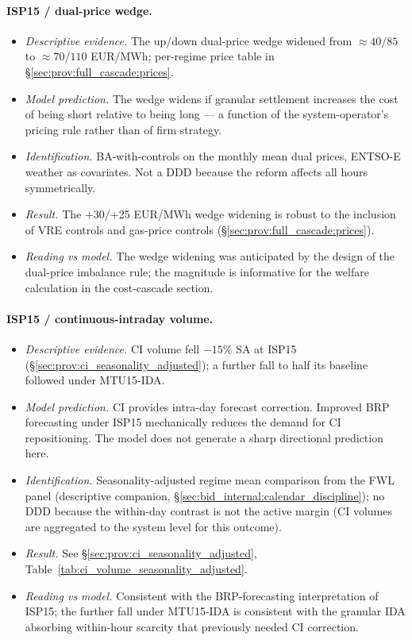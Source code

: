 \documentclass[11pt,a4paper]{article}
\begin{document}
\paragraph{ISP15 / dual-price wedge.}
\begin{itemize}
\item \emph{Descriptive evidence.} The up/down dual-price wedge widened from $\approx 40/85$ to $\approx 70/110$ EUR/MWh; per-regime price table in \S\ref{sec:prov:full_cascade:prices}.
\item \emph{Model prediction.} The wedge widens if granular settlement increases the cost of being short relative to being long --- a function of the system-operator's pricing rule rather than of firm strategy.
\item \emph{Identification.} BA-with-controls on the monthly mean dual prices, ENTSO-E weather as covariates. Not a DDD because the reform affects all hours symmetrically.
\item \emph{Result.} The +30/+25 EUR/MWh wedge widening is robust to the inclusion of VRE controls and gas-price controls (\S\ref{sec:prov:full_cascade:prices}).
\item \emph{Reading vs model.} The wedge widening was anticipated by the design of the dual-price imbalance rule; the magnitude is informative for the welfare calculation in the cost-cascade section.
\end{itemize}

\paragraph{ISP15 / continuous-intraday volume.}
\begin{itemize}
\item \emph{Descriptive evidence.} CI volume fell $-15\%$ SA at ISP15 (\S\ref{sec:prov:ci_seasonality_adjusted}); a further fall to half its baseline followed under MTU15-IDA.
\item \emph{Model prediction.} CI provides intra-day forecast correction. Improved BRP forecasting under ISP15 mechanically reduces the demand for CI repositioning. The model does not generate a sharp directional prediction here.
\item \emph{Identification.} Seasonality-adjusted regime mean comparison from the FWL panel (descriptive companion, \S\ref{sec:bid_internal:calendar_discipline}); no DDD because the within-day contrast is not the active margin (CI volumes are aggregated to the system level for this outcome).
\item \emph{Result.} See \S\ref{sec:prov:ci_seasonality_adjusted}, Table~\ref{tab:ci_volume_seasonality_adjusted}.
\item \emph{Reading vs model.} Consistent with the BRP-forecasting interpretation of ISP15; the further fall under MTU15-IDA is consistent with the granular IDA absorbing within-hour scarcity that previously needed CI correction.
\end{itemize}
\end{document}

